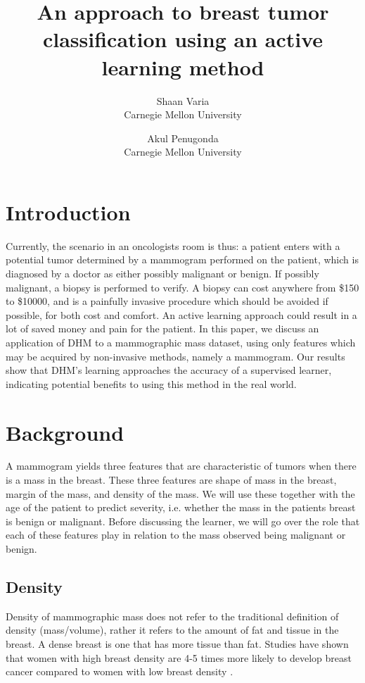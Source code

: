 \documentclass[12pt]{article}
\title{An approach to breast tumor classification using an active learning method}
\author{Shaan Varia \\ Carnegie Mellon University \and Akul Penugonda \\ Carnegie Mellon University}
\begin{document}
\maketitle

\section{Introduction}

Currently, the scenario in an oncologists room is thus: a patient enters with a potential tumor determined by a mammogram performed on the patient, which is diagnosed by a doctor as either possibly malignant or benign. If possibly malignant, a biopsy is performed to verify. A biopsy can cost anywhere from \$150 to \$10000, and is a painfully invasive procedure which should be avoided if possible, for both cost and comfort. An active learning approach could result in a lot of saved money and pain for the patient. In this paper, we discuss an application of DHM to a mammographic mass dataset, using only features which may be acquired by non-invasive methods, namely a mammogram.  Our results show that DHM's learning approaches the accuracy of a supervised learner, indicating potential benefits to using this method in the real world.

\section{Background}

A mammogram yields three features that are characteristic of tumors when there is a mass in the breast. These three features are shape of mass in the breast, margin of the mass, and density of the mass. We will use these together with the age of the patient to predict severity, i.e. whether the mass in the patients breast is benign or malignant. Before discussing the learner, we will go over the role that each of these features play in relation to the mass observed being malignant or benign.

\subsection{Density}

Density of mammographic mass does not refer to the traditional definition of density (mass/volume), rather it refers to the amount of fat and tissue in the breast. A dense breast is one that has more tissue than fat. Studies have shown that women with high breast density are 4-5 times more likely to develop breast cancer compared to women with low breast density \cite{boyd, white}. 
\end{document}
